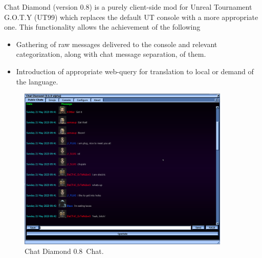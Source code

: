 \documentclass{article}
\theoremstyle{definition}
\newcommand{\ChatDiamondVersion}{0.8}
\begin{document}
Chat Diamond (version \ChatDiamondVersion) is a purely client-side mod for Unreal Tournament G.O.T.Y (UT99) which replaces the default UT console with a more appropriate one.  This functionality allows the achievement of the following
\begin{itemize}
\item Gathering of raw messages delivered to the console and relevant categorization, along with chat message separation, of them.
\item Introduction of appropriate web-query for translation to local or demand of the language.
\end{itemize}

\begin{figure}
\centering
\includegraphics[width=0.9\textwidth]{img}
\caption{Chat Diamond \ChatDiamondVersion~Chat.}
\label{fig:chatdiamond}
\end{figure}
\end{document}
